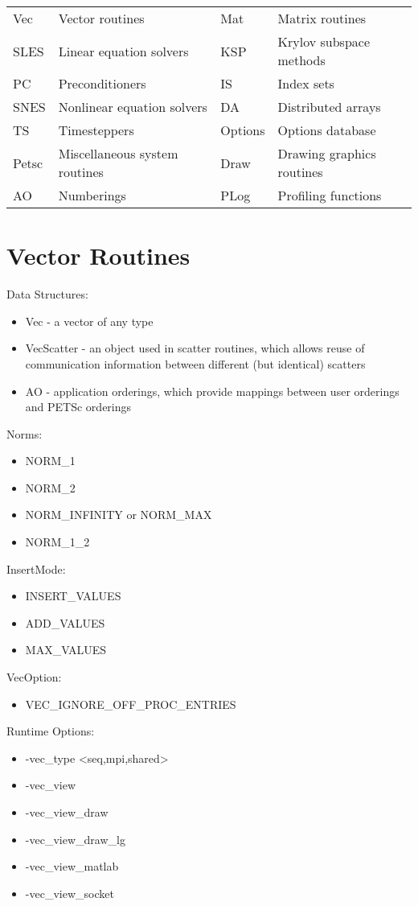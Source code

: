 {\footnotesize
{}

\vspace{.2cm}

\begin{tabular}{llll}
Vec&Vector routines&Mat&Matrix routines\\
SLES&Linear equation solvers& KSP&Krylov subspace methods\\
PC&Preconditioners&IS&Index sets\\
SNES & Nonlinear equation solvers&DA& Distributed arrays \\
TS   & Timesteppers & Options & Options database \\
Petsc & Miscellaneous system routines & Draw & Drawing graphics routines\\
AO & Numberings & PLog & Profiling functions \\
\end{tabular}

\section{Vector Routines}

\noindent
Data Structures: 
\begin{itemize}
\item Vec - a vector of any type
\item VecScatter - an object used in scatter routines, which allows
      reuse of communication information between different (but identical)
      scatters
\item AO - application orderings, which provide mappings between user orderings
           and PETSc orderings
\end{itemize}
Norms:
\begin{itemize}
\item NORM\_1
\item NORM\_2
\item NORM\_INFINITY or NORM\_MAX  
\item NORM\_1\_2 
\end{itemize}
InsertMode:
\begin{itemize}
\item INSERT\_VALUES
\item ADD\_VALUES
\item MAX\_VALUES
\end{itemize}
VecOption:
\begin{itemize}
\item VEC\_IGNORE\_OFF\_PROC\_ENTRIES
\end{itemize}
Runtime Options:
\begin{itemize}
\item -vec\_type <seq,mpi,shared>
\item -vec\_view
\item -vec\_view\_draw
\item -vec\_view\_draw\_lg
\item -vec\_view\_matlab
\item -vec\_view\_socket
\end{itemize}

}
